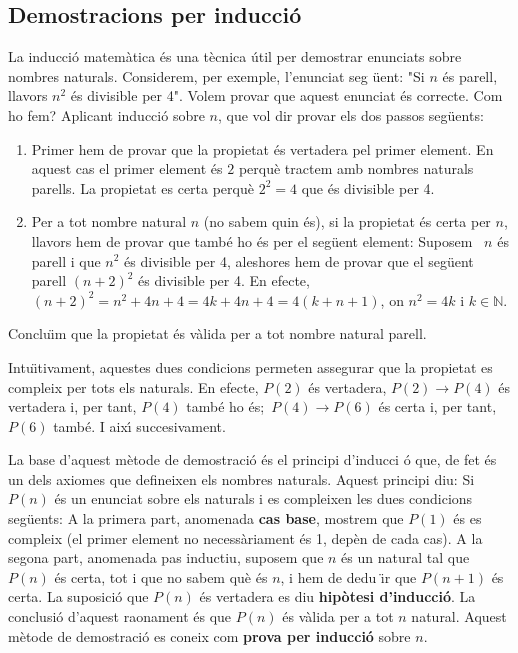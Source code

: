 \subsection{Demostracions per inducci\'{o}\label{subsec:induccio}}

La inducci\'{o} matem\`{a}tica \'{e}s una t\`{e}cnica \'{u}til per demostrar
enunciats sobre nombres naturals. Considerem, per exemple, l'enunciat seg%
\"{u}ent: "Si $n$ \'{e}s parell, llavors $n^{2}$ \'{e}s divisible per 4".
Volem provar que aquest enunciat \'{e}s correcte. Com ho fem? Aplicant
inducci\'{o} sobre $n$, que vol dir provar els dos passos seg\"{u}ents:

\begin{enumerate}
\item Primer hem de provar que la propietat \'{e}s vertadera pel primer
element. En aquest cas el primer element \'{e}s $2$ perqu\`{e} tractem amb
nombres naturals parells. La propietat es certa perqu\`{e} $2^{2}=4$ que
\'{e}s divisible per 4.

\item Per a tot nombre natural $n$ (no sabem quin \'{e}s), si la propietat
\'{e}s certa per $n$, llavors hem de provar que tamb\'{e} ho \'{e}s per el
seg\"{u}ent element: Suposem \ $n$ \'{e}s parell i que $n^{2}$ \'{e}s
divisible per 4, aleshores hem de provar que el seg\"{u}ent parell $%
(n+2)^{2} $ \'{e}s divisible per 4. En efecte, $%
(n+2)^{2}=n^{2}+4n+4=4k+4n+4=4(k+n+1)$, on $n^{2}=4k$ i $k\in\mathbb{N}$.
\end{enumerate}

Conclu\"{\i}m que la propietat \'{e}s v\`{a}lida per a tot nombre natural
parell.

Intu\"{\i}tivament, aquestes dues condicions permeten assegurar que la
propietat es compleix per tots els naturals. En efecte, $P(2)$ \'{e}s
vertadera, $P(2)\longrightarrow P(4)$ \'{e}s vertadera i, per tant, $P(4)$
tamb\'{e} ho \'{e}s;\ $P(4)\longrightarrow P(6)$ \'{e}s certa i, per tant, $%
P(6)$ tamb\'{e}. I aix\'{\i} succesivament.

\bigskip

La base d'aquest m\`{e}tode de demostraci\'{o} \'{e}s el principi d'inducci%
\'{o} que, de fet \'{e}s un dels axiomes que defineixen els nombres
naturals. Aquest principi diu: Si $P(n)$ \'{e}s un enunciat sobre els
naturals i es compleixen les dues condicions seg\"{u}ents: A la primera
part, anomenada \textbf{cas base}, mostrem que $P(1)$ \'{e}s es compleix (el
primer element no necess\`{a}riament \'{e}s 1, dep\`{e}n de cada cas). A la
segona part, anomenada pas inductiu, suposem que $n$ \'{e}s un natural tal
que $P(n)$ \'{e}s certa, tot i que no sabem qu\`{e} \'{e}s $n$, i hem de dedu%
\"{\i}r que $P(n+1)$ \'{e}s certa. La suposici\'{o} que $P(n)$ \'{e}s
vertadera es diu \textbf{hip\`{o}tesi d'inducci\'{o}}. La conclusi\'{o}
d'aquest raonament \'{e}s que $P(n)$ \'{e}s v\`{a}lida per a tot $n$
natural. Aquest m\`{e}tode de demostraci\'{o} es coneix com \textbf{prova
per inducci\'{o}} sobre $n$.

